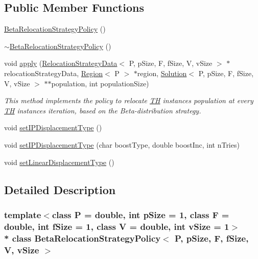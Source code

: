\subsection*{Public Member Functions}
\begin{DoxyCompactItemize}
\item 
\hyperlink{classBetaRelocationStrategyPolicy_a3787cd91ed77d150601350420ca218a6}{Beta\+Relocation\+Strategy\+Policy} ()
\item 
\hyperlink{classBetaRelocationStrategyPolicy_aeaae2cffc71441309bfd6a3e85ad20b1}{$\sim$\+Beta\+Relocation\+Strategy\+Policy} ()
\item 
void \hyperlink{classBetaRelocationStrategyPolicy_aeadaa254d012725ab1a67419d9cb37ef}{apply} (\hyperlink{structRelocationStrategyData}{Relocation\+Strategy\+Data}$<$ P, p\+Size, F, f\+Size, V, v\+Size $>$ $\ast$relocation\+Strategy\+Data, \hyperlink{classRegion}{Region}$<$ P $>$ $\ast$region, \hyperlink{classSolution}{Solution}$<$ P, p\+Size, F, f\+Size, V, v\+Size $>$ $\ast$$\ast$population, int population\+Size)
\begin{DoxyCompactList}\small\item\em This method implements the policy to relocate \hyperlink{classTH}{TH} instance\textquotesingle{}s population at every \hyperlink{classTH}{TH} instance\textquotesingle{}s iteration, based on the Beta-\/distribution strategy. \end{DoxyCompactList}\item 
void \hyperlink{classBetaRelocationStrategyPolicy_a12eb75cb0893c1e1e7795649daa44fdc}{set\+I\+P\+Displacement\+Type} ()
\item 
void \hyperlink{classBetaRelocationStrategyPolicy_aaf793d5a18e2ae159254e7f41b005a6e}{set\+I\+P\+Displacement\+Type} (char boost\+Type, double boost\+Inc, int n\+Tries)
\item 
void \hyperlink{classBetaRelocationStrategyPolicy_ae787cff433b5ce2b6ee8c37b11d6fbfb}{set\+Linear\+Displacement\+Type} ()
\end{DoxyCompactItemize}


\subsection{Detailed Description}
\subsubsection*{template$<$class P = double, int p\+Size = 1, class F = double, int f\+Size = 1, class V = double, int v\+Size = 1$>$\\*
class Beta\+Relocation\+Strategy\+Policy$<$ P, p\+Size, F, f\+Size, V, v\+Size $>$}

